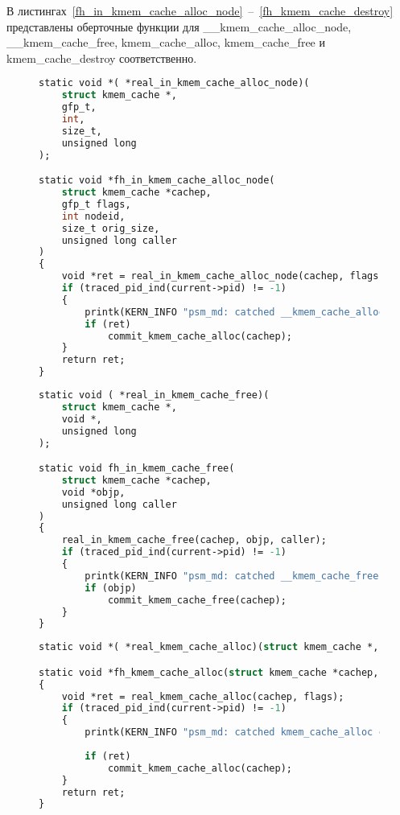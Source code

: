 В листингах~\ref{fh_in_kmem_cache_alloc_node}~--~\ref{fh_kmem_cache_destroy} представлены оберточные функции для \_\_kmem\_cache\_alloc\_node, \_\_kmem\_cache\_free, kmem\_cache\_alloc, kmem\_cache\_free и kmem\_cache\_destroy соответственно.
\begin{figure}[H]
	\begin{lstlisting}[label=fh_in_kmem_cache_alloc_node,caption=Оберточная функция для \_\_kmem\_cache\_alloc\_node,language=Caml]
static void *( *real_in_kmem_cache_alloc_node)(
	struct kmem_cache *,
	gfp_t,
	int,
	size_t,
	unsigned long
);

static void *fh_in_kmem_cache_alloc_node(
	struct kmem_cache *cachep,
	gfp_t flags,
	int nodeid,
	size_t orig_size,
	unsigned long caller
)
{
	void *ret = real_in_kmem_cache_alloc_node(cachep, flags, nodeid, orig_size, caller);
	if (traced_pid_ind(current->pid) != -1)
	{
		printk(KERN_INFO "psm_md: catched __kmem_cache_alloc_node call from %d\n", current->pid);
		if (ret)
			commit_kmem_cache_alloc(cachep);
	}
	return ret;
}
	\end{lstlisting}
\end{figure}
\begin{figure}[H]
	\begin{lstlisting}[label=fh_in_kmem_cache_free,caption=Оберточная функция для \_\_kmem\_cache\_free,language=Caml]
static void ( *real_in_kmem_cache_free)(
	struct kmem_cache *,
	void *,
	unsigned long
);

static void fh_in_kmem_cache_free(
	struct kmem_cache *cachep,
	void *objp,
	unsigned long caller
)
{
	real_in_kmem_cache_free(cachep, objp, caller);
	if (traced_pid_ind(current->pid) != -1)
	{
		printk(KERN_INFO "psm_md: catched __kmem_cache_free call from %d\n", current->pid);
		if (objp)
			commit_kmem_cache_free(cachep);
	}
}
	\end{lstlisting}
\end{figure}
\begin{figure}[H]
	\begin{lstlisting}[label=fh_kmem_cache_alloc,caption=Оберточная функция для kmem\_cache\_alloc,language=Caml]
static void *( *real_kmem_cache_alloc)(struct kmem_cache *, gfp_t);

static void *fh_kmem_cache_alloc(struct kmem_cache *cachep, gfp_t flags)
{
	void *ret = real_kmem_cache_alloc(cachep, flags);
	if (traced_pid_ind(current->pid) != -1)
	{
		printk(KERN_INFO "psm_md: catched kmem_cache_alloc call from %d\n", current->pid);
		
		if (ret)
			commit_kmem_cache_alloc(cachep);
	}
	return ret;
}
	\end{lstlisting}
\end{figure}
